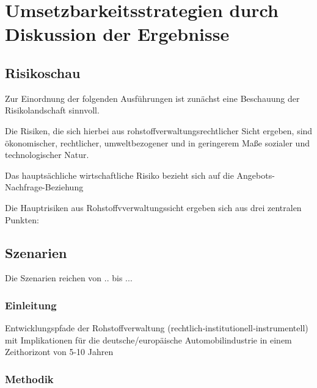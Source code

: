 \documentclass[12pt,a4paper,oneside]{book} %
\begin{document}
	
\chapter{Umsetzbarkeitsstrategien durch Diskussion der Ergebnisse}	

\section{Risikoschau}

Zur Einordnung der folgenden Ausführungen ist zunächst eine Beschauung der Risikolandschaft sinnvoll.

Die Risiken, die sich hierbei aus rohstoffverwaltungsrechtlicher Sicht ergeben, sind ökonomischer, rechtlicher, umweltbezogener und in geringerem Maße sozialer und technologischer Natur.

Das hauptsächliche wirtschaftliche Risiko bezieht sich auf die Angebots-Nachfrage-Beziehung

Die Hauptrisiken aus Rohstoffvverwaltungssicht ergeben sich aus drei zentralen Punkten: 

\section{Szenarien}

Die Szenarien reichen von .. bis ...




\subsection{Einleitung}

Entwicklungspfade der Rohstoffverwaltung (rechtlich‑institutionell‑instrumentell) mit Implikationen für die deutsche/europäische Automobilindustrie in einem Zeithorizont von 5-10 Jahren


\subsection{Methodik}
\end{document}
